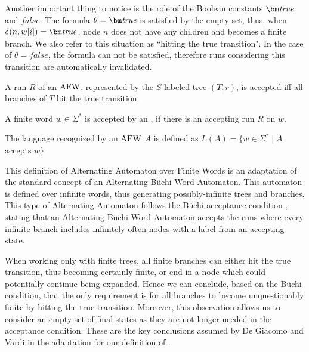 Another important thing to notice is the role of the Boolean constants $\tpbf$ and $\bm{\mathit{false}}$. The formula $\theta=\tpbf$ is satisfied by the empty set, thus, when $\delta(n,w[i])=\tpbf$, node $n$ does not have any children and becomes a finite branch. We also refer to this situation as ``hitting the true transition". In the case of $\theta=\bm{\mathit{false}}$, the formula can not be satisfied, therefore runs considering this transition are automatically invalidated. 

\begin{definition}
    A run $R$ of an $\mathrm{AFW}$, represented by the $S$-labeled tree $(T,r)$, is accepted iff all branches of $T$ hit the true transition. 
\end{definition}

\begin{definition}[Acceptance]
    A finite word $w\in\Sigma^*$ is accepted by an \AFW, if there is an accepting run $R$ on $w$.
\end{definition}

\begin{definition}[Language]
    The language recognized by an $\mathrm{AFW}$ $A$ is defined as $L(A)=\{w \in \Sigma^* \mid A$ accepts $w\}$
\end{definition}

This definition of Alternating Automaton over Finite Words is an adaptation of the standard concept of an Alternating Büchi Word Automaton. This automaton is defined over infinite words, thus generating possibly-infinite trees and branches. This type of Alternating Automaton follows the Büchi acceptance condition \cite{buchi1990decision}, stating that an Alternating Büchi Word Automaton accepts the runs where every infinite branch includes infinitely often nodes with a label from an accepting state.


When working only with finite trees, all finite branches can either hit the true transition, thus becoming certainly finite, or end in a node which could potentially continue being expanded. Hence we can conclude, based on the Büchi condition, that the only requirement is for all branches to become unquestionably finite by hitting the true transition. Moreover, this observation allows us to consider an empty set of final states as they are not longer needed in the acceptance condition. These are the key conclusions assumed by De Giacomo and Vardi \cite{giavar15a} in the adaptation for our definition of \AFW.


